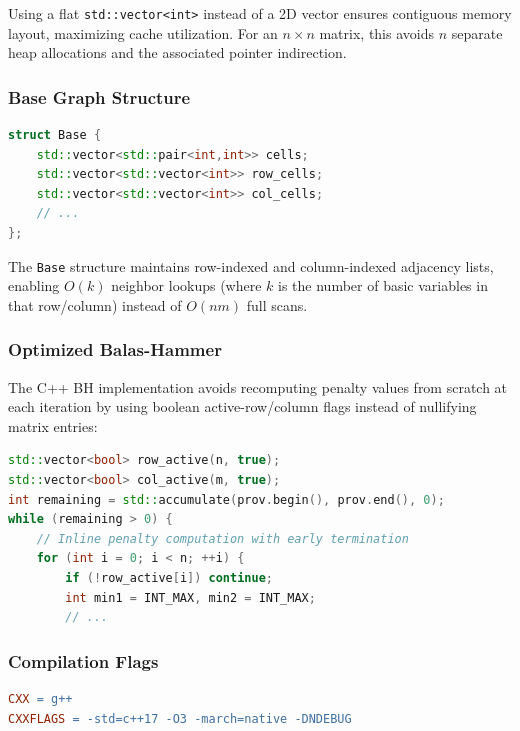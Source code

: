 \documentclass[12pt,a4paper]{article}
\begin{document}
Using a flat \texttt{std::vector<int>} instead of a 2D vector ensures contiguous memory layout, maximizing cache utilization. For an $n \times n$ matrix, this avoids $n$ separate heap allocations and the associated pointer indirection.

\subsubsection{Base Graph Structure}

\begin{lstlisting}[language=C++, caption={Indexed base structure for fast lookups}]
struct Base {
    std::vector<std::pair<int,int>> cells;
    std::vector<std::vector<int>> row_cells;
    std::vector<std::vector<int>> col_cells;
    // ...
};
\end{lstlisting}

The \texttt{Base} structure maintains row-indexed and column-indexed adjacency lists, enabling $O(k)$ neighbor lookups (where $k$ is the number of basic variables in that row/column) instead of $O(nm)$ full scans.

\subsubsection{Optimized Balas-Hammer}

The C++ BH implementation avoids recomputing penalty values from scratch at each iteration by using boolean active-row/column flags instead of nullifying matrix entries:

\begin{lstlisting}[language=C++, caption={Efficient penalty computation}]
std::vector<bool> row_active(n, true);
std::vector<bool> col_active(m, true);
int remaining = std::accumulate(prov.begin(), prov.end(), 0);
while (remaining > 0) {
    // Inline penalty computation with early termination
    for (int i = 0; i < n; ++i) {
        if (!row_active[i]) continue;
        int min1 = INT_MAX, min2 = INT_MAX;
        // ...
\end{lstlisting}

\subsubsection{Compilation Flags}

\begin{lstlisting}[language=make, caption={Makefile optimization flags}]
CXX = g++
CXXFLAGS = -std=c++17 -O3 -march=native -DNDEBUG
\end{lstlisting}
\end{document}
